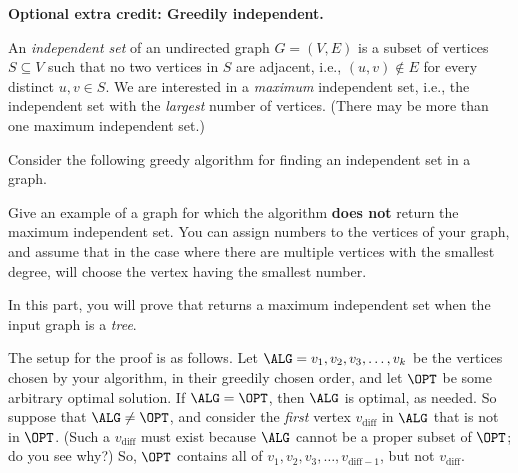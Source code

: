 \documentclass[11pt,addpoints]{exam}
\begin{document}
\begin{questions}
\begin{parts}
  \end{parts}
  

  \bonusquestion \textbf{Optional extra credit: Greedily independent.} 

  
  \nopagebreak

  An \emph{independent set} of an undirected graph $G=(V,E)$ is a subset of vertices $S \subseteq V$ such that no two vertices in $S$ are adjacent, i.e., $(u,v) \notin E$ for every distinct $u,v \in S$.
  We are interested in a \emph{maximum} independent set, i.e., the independent set with the \emph{largest} number of vertices.
  (There may be more than one maximum independent set.)
    
  Consider the following greedy algorithm for finding an independent set in a graph.

  \begin{minipage}{\linewidth}
    \begin{algorithm}[H]
      \begin{algorithmic}[1]
        \EndWhile
        \EndFunction
      \end{algorithmic}
    \end{algorithm}
  \end{minipage}

  \begin{parts}

    \bonuspart[1]
    
    Give an example of a graph for which the algorithm  \textbf{does not} return the maximum independent set.
    You can assign numbers to the vertices of your graph, and assume that in the case where there are multiple vertices with the smallest degree,  will choose the vertex having the smallest number. 
    \begin{solution}
    \end{solution}

    
    \bonuspart[2] In this part, you will prove that  returns a maximum independent set when the input graph is a \emph{tree}.

    The setup for the proof is as follows.
    Let $\ALG=v_1,v_2,v_3,\dots,v_k$ be the vertices chosen by your algorithm, in their greedily chosen order, and let $\OPT$ be some arbitrary optimal solution.
    If $\ALG = \OPT$, then $\ALG$ is optimal, as needed.
    So suppose that $\ALG \neq \OPT$, and consider the \emph{first} vertex $v_{\text{diff}}$ in $\ALG$ that is not in $\OPT$.
    (Such a $v_{\text{diff}}$ must exist because $\ALG$ cannot be a proper subset of $\OPT$; do you see why?)
    So, $\OPT$ contains all of $v_1,v_2,v_3,\dots,v_{\text{diff}-1}$, but not $v_{\text{diff}}$.
    

\end{parts}
\end{questions}
\end{document}
